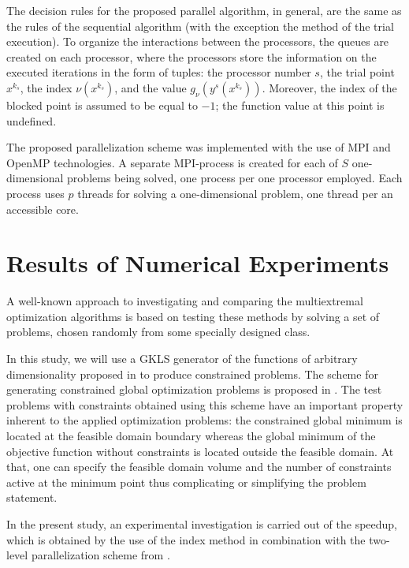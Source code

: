 \documentclass[smallextended]{svjour3}       %
\begin{document}
The decision rules for the proposed parallel algorithm, in general, are the same as the rules of the 
sequential algorithm (with the exception the method of the trial execution). To organize the 
interactions between the processors, the queues are created on each processor, where the 
processors store the information on the executed iterations in the form of tuples: the processor 
number $s$, the trial point $x^{k_s}$, the index $\nu(x^{k_s})$, and the value $g_\nu(y^s
(x^{k_s} ) )$. Moreover, the index of the blocked point is assumed to be equal to $-1$; the 
function value at this point is undefined.

The proposed parallelization scheme was implemented with the use of MPI and OpenMP 
technologies. A separate MPI-process is created for each of $S$ one-dimensional problems 
being solved, one process per one processor employed. Each process uses $p$ threads for 
solving a one-dimensional problem, one thread per an accessible core.

\section{Results of Numerical Experiments}
\label{sec:4}

A well-known approach to investigating and comparing the multiextremal optimization 
algorithms is based on testing these methods by solving a set of problems, chosen randomly 
from some specially designed class.

In this study, we will use a GKLS generator of the functions of arbitrary dimensionality 
proposed in \cite{Gaviano2003} to produce constrained problems. The scheme for generating 
constrained global optimization problems is proposed in \cite{Gergel2017}. 
The test problems with constraints obtained using this scheme have an important property 
inherent to the applied optimization problems: the constrained global minimum is located at the 
feasible domain boundary whereas the global minimum of the objective function without 
constraints is located outside the feasible domain. At that, one can specify the feasible domain 
volume and the number of constraints active at the minimum point thus complicating or 
simplifying the problem statement.

In the present study, an experimental investigation is carried out of the speedup, which is 
obtained by the use of the index method in combination with the two-level parallelization 
scheme from \cite{Sidorov2015}.
\end{document}
